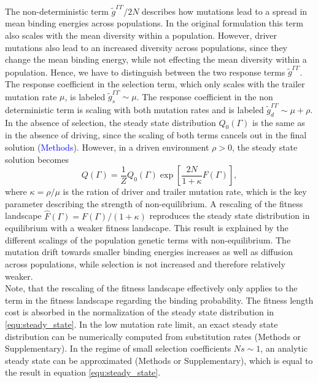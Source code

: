 \documentclass[10pt,a4paper]{article}
\begin{document}
	The non-deterministic term $\tilde{g}^{\Gamma\Gamma}/2N$ describes how mutations lead to a spread in mean binding energies across populations. In the original formulation this term also scales with the mean diversity within a population. However, driver mutations also lead to an increased diversity across populations, since they change the mean binding energy, while not effecting the mean diversity within a population. Hence, we have to distinguish between the two response terms $\tilde{g}^{\Gamma\Gamma}$. The response coefficient in the selection term, which only scales with the trailer mutation rate $\mu$, is labeled $\tilde{g}^{\Gamma\Gamma}_s\sim\mu$. The response coefficient in the non deterministic term is scaling with both mutation rates and is labeled $\tilde{g}^{\Gamma\Gamma}_d\sim\mu+\rho$.\\
	In the absence of selection, the steady state distribution $Q_0(\Gamma)$ is the same as in the absence of driving, since the scaling of both terms cancels out in the final solution (\textcolor{blue}{Methods}). However, in a driven environment $\rho>0$, the steady state solution becomes
	\begin{equation}
		Q(\Gamma)=\frac{1}{Z}Q_0(\Gamma)\exp\left[\frac{2N}{1+\kappa}F(\Gamma)\right],\label{equ:steady_state}
	\end{equation}
	where $\kappa=\rho/\mu$ is the ration of driver and trailer mutation rate, which is the key parameter describing the strength of non-equilibrium. A rescaling of the fitness landscape $\hat{F}(\Gamma)=F(\Gamma)/(1+\kappa)$ reproduces the steady state distribution in equilibrium with a weaker fitness landscape. This result is explained by the different scalings of the population genetic terms with non-equilibrium. The mutation drift towards smaller binding energies increases as well as diffusion across populations, while selection is not increased and therefore relatively weaker.\\
	Note, that the rescaling of the fitness landscape effectively only applies to the term in the fitness landscape regarding the binding probability. The fitness length cost is absorbed in the normalization of the steady state distribution in \ref{equ:steady_state}.
	In the low mutation rate limit, an exact steady state distribution can be numerically computed from substitution rates (Methods or Supplementary). In the regime of small selection coefficients $Ns\sim1$, an analytic steady state can be approximated (Methods or Supplementary), which is equal to the result in equation \ref{equ:steady_state}.
\end{document}
